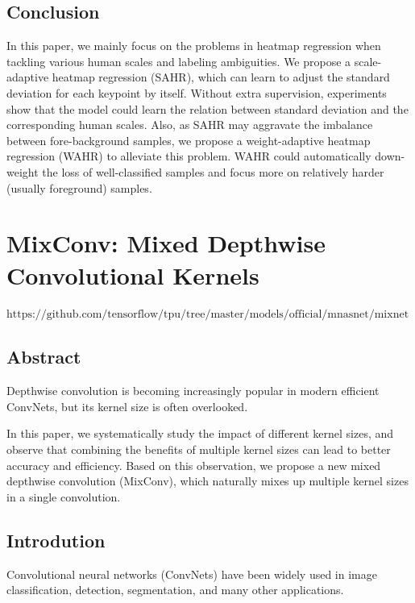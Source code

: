 \documentclass[11pt]{article}
\begin{document}
\subsection{Conclusion}
In this paper, we mainly focus on the problems in heatmap regression when tackling various human scales and labeling ambiguities. We propose a scale-adaptive heatmap
regression (SAHR), which can learn to adjust the standard deviation for each keypoint by itself. Without extra supervision, experiments show that the model could learn the relation between standard deviation and the corresponding human scales. Also, as SAHR may aggravate the imbalance between fore-background samples, we propose a weight-adaptive heatmap regression (WAHR) to alleviate this problem. WAHR could automatically down-weight the loss of well-classified samples and focus more on relatively harder (usually foreground) samples.
\section{MixConv: Mixed Depthwise Convolutional Kernels}
$\text{https://github.com/tensorflow/tpu/tree/master/models/official/mnasnet/mixnet}$
\subsection{Abstract}
Depthwise convolution is becoming increasingly popular in modern efficient ConvNets, but its kernel size is often overlooked.

In this paper, we systematically study the impact of different kernel sizes, and observe that combining the benefits of multiple kernel sizes can lead to better accuracy and efficiency. Based on this observation, we propose a new mixed depthwise convolution (MixConv), which naturally mixes up multiple kernel sizes in a single convolution.
\subsection{Introdution}
Convolutional neural networks (ConvNets) have been widely used in image classification,
detection, segmentation, and many other applications.
\end{document}
